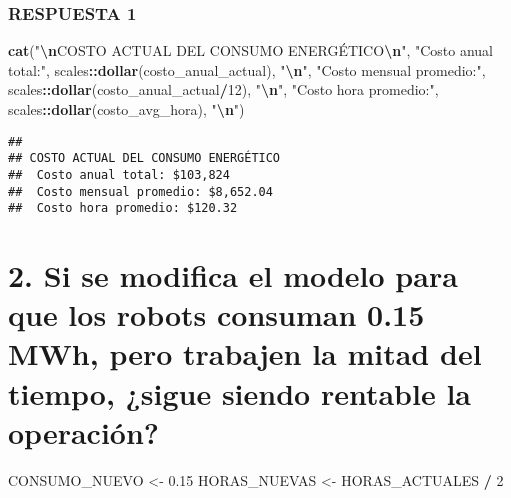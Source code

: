\documentclass[
]{article}
\newenvironment{Shaded}{\begin{snugshade}}{\end{snugshade}}
\newcommand{\DecValTok}[1]{\textcolor[rgb]{0.00,0.00,0.81}{#1}}
\newcommand{\FloatTok}[1]{\textcolor[rgb]{0.00,0.00,0.81}{#1}}
\newcommand{\FunctionTok}[1]{\textcolor[rgb]{0.13,0.29,0.53}{\textbf{#1}}}
\newcommand{\NormalTok}[1]{#1}
\newcommand{\OtherTok}[1]{\textcolor[rgb]{0.56,0.35,0.01}{#1}}
\newcommand{\SpecialCharTok}[1]{\textcolor[rgb]{0.81,0.36,0.00}{\textbf{#1}}}
\newcommand{\StringTok}[1]{\textcolor[rgb]{0.31,0.60,0.02}{#1}}
\begin{document}
\subsubsection{RESPUESTA 1}\label{respuesta-1}

\begin{Shaded}
\begin{Highlighting}[]
\FunctionTok{cat}\NormalTok{(}\StringTok{"}\SpecialCharTok{\textbackslash{}n}\StringTok{COSTO ACTUAL DEL CONSUMO ENERGÉTICO}\SpecialCharTok{\textbackslash{}n}\StringTok{"}\NormalTok{, }\StringTok{"Costo anual total:"}\NormalTok{, scales}\SpecialCharTok{::}\FunctionTok{dollar}\NormalTok{(costo\_anual\_actual), }\StringTok{"}\SpecialCharTok{\textbackslash{}n}\StringTok{"}\NormalTok{, }\StringTok{"Costo mensual promedio:"}\NormalTok{, scales}\SpecialCharTok{::}\FunctionTok{dollar}\NormalTok{(costo\_anual\_actual}\SpecialCharTok{/}\DecValTok{12}\NormalTok{), }\StringTok{"}\SpecialCharTok{\textbackslash{}n}\StringTok{"}\NormalTok{, }\StringTok{"Costo hora promedio:"}\NormalTok{, scales}\SpecialCharTok{::}\FunctionTok{dollar}\NormalTok{(costo\_avg\_hora), }\StringTok{"}\SpecialCharTok{\textbackslash{}n}\StringTok{"}\NormalTok{)}
\end{Highlighting}
\end{Shaded}

\begin{verbatim}
## 
## COSTO ACTUAL DEL CONSUMO ENERGÉTICO
##  Costo anual total: $103,824 
##  Costo mensual promedio: $8,652.04 
##  Costo hora promedio: $120.32
\end{verbatim}

\section{2. Si se modifica el modelo para que los robots consuman 0.15
MWh, pero trabajen la mitad del tiempo, ¿sigue siendo rentable la
operación?}\label{si-se-modifica-el-modelo-para-que-los-robots-consuman-0.15-mwh-pero-trabajen-la-mitad-del-tiempo-sigue-siendo-rentable-la-operaciuxf3n}

\begin{Shaded}
\begin{Highlighting}[]
\NormalTok{CONSUMO\_NUEVO }\OtherTok{\textless{}{-}} \FloatTok{0.15}
\NormalTok{HORAS\_NUEVAS }\OtherTok{\textless{}{-}}\NormalTok{ HORAS\_ACTUALES }\SpecialCharTok{/} \DecValTok{2}
\end{Highlighting}
\end{Shaded}
\end{document}
